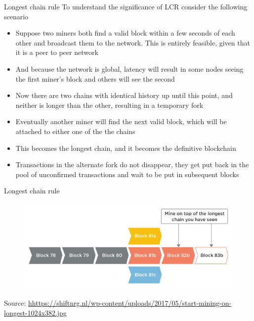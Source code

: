 \documentclass[11pt]{beamer}
\begin{document}

\begin{frame}{Longest chain rule}
	To understand the significance of LCR consider the following scenario
	\begin{itemize}
		\item Suppose two miners both find a valid block within a few seconds of each other and broadcast them to the network. This is entirely feasible, given that it is a peer to peer network
		\item And because the network is global, latency will result in some nodes seeing the first miner's block and others will see the second
		\item Now there are two chains with identical history up until this point, and neither is longer than the other, resulting in a temporary fork
		\item Eventually another miner will find the next valid block, which will be attached to either one of the the chains
		\item This becomes the longest chain, and it becomes the definitive blockchain
		\item Transactions in the alternate fork do not disappear, they get put back in the pool of unconfirmed transactions and wait to be put in subsequent blocks
	\end{itemize}
\end{frame}


\begin{frame}{Longest chain rule}
	\begin{figure}[]
		\centering
		\includegraphics  [scale=0.5]{Images/lcr}
	\end{figure}
	\begin{tiny}
		Source: \href{https://shiftnrg.nl/docs/basic-knowledge/blockchain/what-are-blockchains-problems}{hhttps://shiftnrg.nl/wp-content/uploads/2017/05/start-mining-on-longest-1024x382.jpg}
	\end{tiny}
\end{frame}
\end{document}
